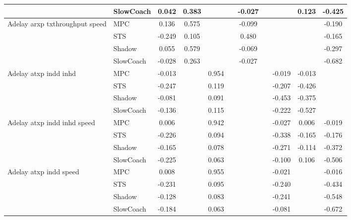 \begin{tabular}{|l|l|*{9}{c|}}
                              & SlowCoach &    0.042 &     0.383 &        &     & -0.027 &     &      &   0.123 &   -0.425 \\
\midrule
Adelay arxp txthroughput speed    & MPC &    0.136 &     0.575 &        &     & -0.099 &     &      &      &   -0.190 \\
                              & STS &   -0.249 &     0.105 &        &     &  0.480 &     &      &      &   -0.165 \\
                              & Shadow &    0.055 &     0.579 &        &     & -0.069 &     &      &      &   -0.297 \\
                              & SlowCoach &   -0.028 &     0.263 &        &     & -0.027 &     &      &      &   -0.682 \\
\midrule
Adelay atxp indd inhd    & MPC &   -0.013 &        &     0.954 &     &     &     &  -0.019 &  -0.013 &       \\
                              & STS &   -0.247 &        &     0.119 &     &     &     &  -0.207 &  -0.426 &       \\
                              & Shadow &   -0.081 &        &     0.091 &     &     &     &  -0.453 &  -0.375 &       \\
                              & SlowCoach &   -0.136 &        &     0.115 &     &     &     &  -0.222 &  -0.527 &       \\
\midrule
Adelay atxp indd inhd speed    & MPC &    0.006 &        &     0.942 &     &     &     &  -0.027 &   0.006 &   -0.019 \\
                              & STS &   -0.226 &        &     0.094 &     &     &     &  -0.338 &  -0.165 &   -0.176 \\
                              & Shadow &   -0.165 &        &     0.078 &     &     &     &  -0.271 &  -0.114 &   -0.372 \\
                              & SlowCoach &   -0.225 &        &     0.063 &     &     &     &  -0.100 &   0.106 &   -0.506 \\
\midrule
Adelay atxp indd speed    & MPC &    0.008 &        &     0.955 &     &     &     &  -0.021 &      &   -0.016 \\
                              & STS &   -0.231 &        &     0.095 &     &     &     &  -0.240 &      &   -0.434 \\
                              & Shadow &   -0.128 &        &     0.083 &     &     &     &  -0.241 &      &   -0.548 \\
                              & SlowCoach &   -0.184 &        &     0.063 &     &     &     &  -0.081 &      &   -0.672 \\

\end{tabular}
